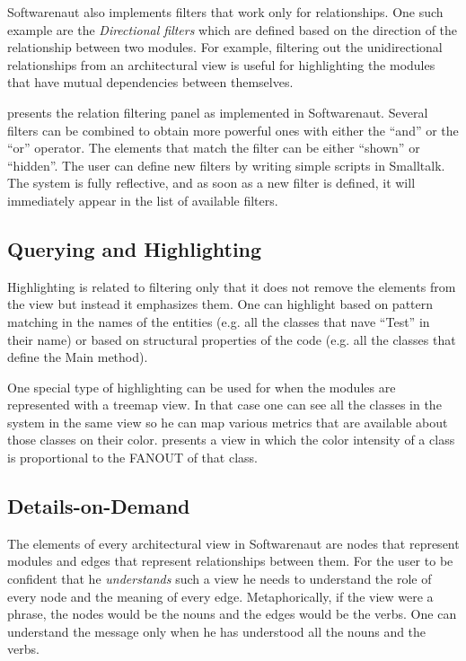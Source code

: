 \documentclass[preprint,12pt]{elsarticle}
\begin{document}
Softwarenaut also implements filters that work only for relationships. One such example are the {\em Directional filters} which are defined based on the direction of the relationship between two modules. For example, filtering out the unidirectional relationships from an architectural view is useful for highlighting the modules that have mutual dependencies between themselves. 

 presents the relation filtering panel as implemented in Softwarenaut. Several filters can be combined to obtain more powerful ones with either the ``and'' or the ``or'' operator. The elements that match the filter can be either ``shown'' or ``hidden''. The user can define new filters by writing simple scripts in Smalltalk. The system is fully reflective, and as soon as a new filter is defined, it will immediately appear in the list of available filters.


\subsection {Querying and Highlighting}
Highlighting is related to filtering only that it does not remove the elements from the view but instead it emphasizes them. One can highlight based on pattern matching in the names of the entities (e.g. all the classes that nave ``Test'' in their name) or based on structural properties of the code (e.g. all the classes that define the Main method). 

One special type of highlighting can be used for when the modules are represented with a treemap view. In that case one can see all the classes in the system in the same view so he can map various metrics that are available about those classes on their color.  presents a view in which the color intensity of a class is proportional to the FANOUT of that class.%

\subsection {Details-on-Demand} 

The elements of every architectural view in Softwarenaut are nodes that represent modules and edges that represent relationships between them. For the user to be confident that he {\em understands} such a view he needs to understand the role of every node and the meaning of every edge. Metaphorically, if the view were a phrase, the nodes would be the nouns and the edges would be the verbs. One can understand the message only when he has understood all the nouns and the verbs.
\end{document}

